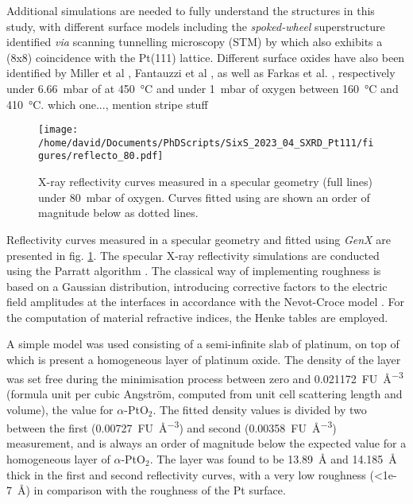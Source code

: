 Additional simulations are needed to fully understand the structures in this study, with different surface models including the \textit{spoked-wheel} superstructure identified \textit{via} scanning tunnelling microscopy (STM) by \cite{VanSpronsen2017, Boden2022} which also exhibits a (8x8) coincidence with the Pt(111) lattice.
Different surface oxides have also been identified by Miller et al \parencite*{Miller2011, Miller2014}, Fantauzzi et al \parencite*{Fantauzzi2017}, as well as Farkas et al. \parencite*{Farkas2017}, respectively under \qty{6.66}{\milli\bar} of  at \qty{450}{\degreeCelsius} and under \qty{1}{\milli\bar} of oxygen between \qty{160}{\degreeCelsius} and \qty{410}{\degreeCelsius}.
\textcolor{Important}{which one..., mention stripe stuff}

\begin{figure}[!htb]
    \centering
    \texttt{[image: /home/david/Documents/PhDScripts/SixS\_2023\_04\_SXRD\_Pt111/figures/reflecto\_80.pdf]}
    \caption{
    	X-ray reflectivity curves measured in a specular geometry (full lines) under \qty{80}{\milli\bar} of oxygen.
    	Curves fitted using  are shown an order of magnitude below as dotted lines.
    }
    \label{fig:Reflecto80}
\end{figure}

Reflectivity curves measured in a specular geometry and fitted using \textit{GenX} \parencite{Bjorck2007, Glavic2022} are presented in fig. \ref{fig:Reflecto80}.
The specular X-ray reflectivity simulations are conducted using the Parratt algorithm \parencite{Parratt1954}.
The classical way of implementing roughness is based on a Gaussian distribution, introducing corrective factors to the electric field amplitudes at the interfaces in accordance with the Nevot-Croce model \parencite{Nevot1980}.
For the computation of material refractive indices, the Henke tables \parencite{Henke1993} are employed.

A simple model was used consisting of a semi-infinite slab of platinum, on top of which is present a homogeneous layer of platinum oxide.
The density of the layer was set free during the minimisation process between zero and \qty{0.021172}{FU\per\cubic\angstrom} (formula unit per cubic Angström, computed from unit cell scattering length and volume), the value for $\alpha$-PtO$_2$.
The fitted density values is divided by two between the first (\qty{0.00727}{FU\per\cubic\angstrom}) and second (\qty{0.00358}{FU\per\cubic\angstrom}) measurement, and is always an order of magnitude below the expected value for a homogeneous layer of $\alpha$-PtO$_2$.
The layer was found to be \qty{13.89}{\angstrom} and \qty{14.185}{\angstrom} thick in the first and second reflectivity curves, with a very low roughness (\qty{<1e-7}{\angstrom}) in comparison with the roughness of the Pt surface.

